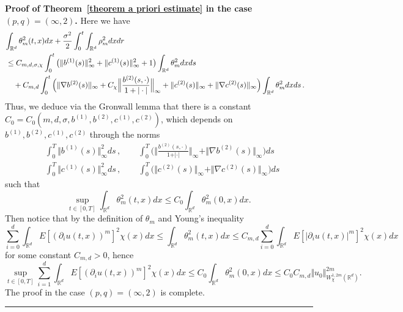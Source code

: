 \documentclass[a4paper,10pt]{article}
\newenvironment{proof}[1][Proof]{\noindent\textbf{#1.} }{\ \rule{0.5em}{0.5em}}
\begin{document}
\begin{proof}[Proof of Theorem~\ref{theorem a priori estimate} in the case
$(p,q)=(\infty,2)$] Here we have
\begin{align*}
\lefteqn{ \int_{\mathbb{R}^{d}}\theta_{m}^{2}(t,x)dx+\frac{\sigma^{2}}{2}\int_{0} 
^{t}\int_{\mathbb{R}^{d}}\rho_{m}^{2}dxdr }\\
&  \leq C_{m,d,\sigma,\chi}\int_{0}^{t} \big(\Vert b^{(1)}(s) \Vert_{\infty}^{2}+\Vert c^{(1)}(s)  \Vert_{\infty}^{2} +1 \big)  \int_{\mathbb{R}^{d}}\theta_{m}^{2}dxds\\
& \quad {} +C_{m,d}\int_{0}^{t} \Big( \Vert \nabla b^{(2)}(s) \Vert_{\infty} +C_{\chi} \Big\Vert \frac{b^{(2)}(s,\cdot)}{1+\vert \cdot\vert }\Big\Vert
_{\infty}+ \Vert c^{(2)}(s)  \Vert_{\infty}+ \Vert \nabla c^{(2)}(s) \Vert_{\infty} \Big)  \int_{\mathbb{R}^{d}} \theta_{m}^{2}dxds \,.
\end{align*}
Thus, we deduce via the Gronwall lemma that there is a constant $C_{0} 
=C_{0}(m,d,\sigma,b^{(1)  },b^{(2)
},c^{(1)  },c^{(2)  })$, which depends on
$b^{(1)  },b^{(2)  },c^{(1)
},c^{(2)  }$ through the norms 
\begin{align*}
&  \int_{0}^{T} \Vert b^{(1)}(s) \Vert_{\infty}^{2}ds \, ,\qquad \int_{0}^{T} \Big( \Big\Vert \frac{b^{(2)}(s,\cdot) }{1+\vert \cdot\vert
}\Big\Vert_{\infty}+\Vert \nabla b^{(2)}(s) \Vert_{\infty} \Big)  ds\\
&  \int_{0}^{T} \Vert c^{(1)}(s)  \Vert_{\infty}^{2} ds \, , \qquad \int_{0}^{T}\big(\Vert c^{(2)}(s)  \Vert _{\infty}+ \Vert \nabla c^{(2)}(s) \Vert_{\infty} \big)  ds
\end{align*}
such that
\begin{equation}
\sup_{t\in [  0,T]  }\int_{\mathbb{R}^{d}}\theta_{m}^{2}(t,x)dx\leq
C_{0}\int_{\mathbb{R}^{d}}\theta_{m}^{2}(0,x)dx.\label{final bound on theta} 
\end{equation}
Then notice that by the definition of $\theta_m$ and Young's inequality
\[
\sum_{i=0}^{d}\int_{\mathbb{R}^{d}}E[(\partial_{i}u(t,x))
^{m}]^{2}\chi(x)  dx\leq\int_{\mathbb{R}^{d}}\theta
_{m}^{2}(t,x)dx\leq C_{m,d}\sum_{i=0}^{d}\int_{\mathbb{R}^{d}}E[
\vert \partial_{i}u(t,x)\vert ^{m}]^{2}\chi(x)  dx
\]
for some constant $C_{m,d}>0$, hence
\[
\sup_{t\in[0,T]} \sum_{i=1}^{d}\int_{\mathbb{R}^{d}}E[(\partial_{i}u(t,x))^{m}]^{2} \chi(x)
dx\leq C_{0}\int_{\mathbb{R}^{d}}\theta_{m}^{2}(0,x)dx\leq C_{0} 
C_{m,d}\Vert u_{0}\Vert_{W_{\chi}^{1,2m}(\mathbb{R}^{d})}^{2m}.
\]
The proof in the case $(p,q)=(\infty,2)$ is complete.
\end{proof}
\end{document}
